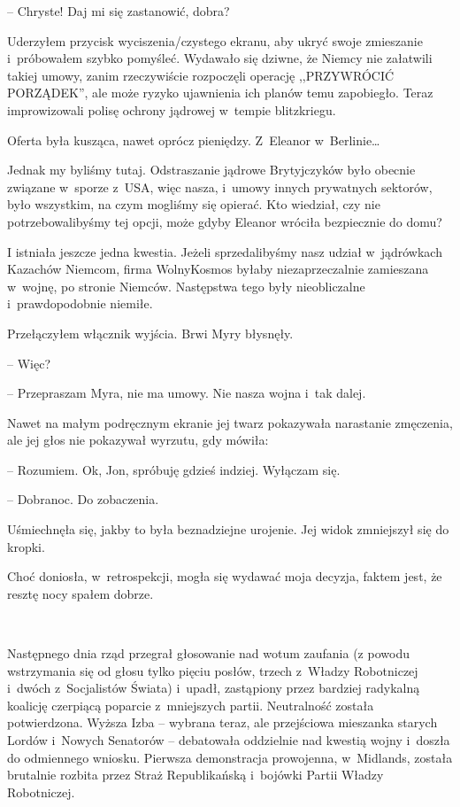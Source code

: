 \documentclass[oneside,polish,11pt,sfheadings]{mwbk}
\begin{document}
-- Chryste! Daj mi się zastanowić, dobra?

Uderzyłem przycisk wyciszenia/czystego ekranu, aby ukryć swoje
zmieszanie i~próbowałem szybko pomyśleć. Wydawało się dziwne, że Niemcy
nie załatwili takiej umowy, zanim rzeczywiście rozpoczęli operację
,,PRZYWRÓCIĆ PORZĄDEK'', ale może ryzyko ujawnienia ich planów temu
zapobiegło. Teraz improwizowali polisę ochrony jądrowej w~tempie
blitzkriegu.

Oferta była kusząca, nawet oprócz pieniędzy. Z~Eleanor w~Berlinie\ldots

Jednak my byliśmy tutaj. Odstraszanie jądrowe Brytyjczyków było obecnie
związane w~sporze z~USA, więc nasza, i~umowy innych prywatnych sektorów,
było wszystkim, na czym mogliśmy się opierać. Kto wiedział, czy nie
potrzebowalibyśmy tej opcji, może gdyby Eleanor wróciła bezpiecznie do
domu?

I istniała jeszcze jedna kwestia. Jeżeli sprzedalibyśmy nasz udział w~jądrówkach Kazachów Niemcom, firma WolnyKosmos byłaby niezaprzeczalnie
zamieszana w~wojnę, po stronie Niemców. Następstwa tego były
nieobliczalne i~prawdopodobnie niemiłe.

Przełączyłem włącznik wyjścia. Brwi Myry błysnęły.

-- Więc?

-- Przepraszam Myra, nie ma umowy. Nie nasza wojna i~tak dalej.

Nawet na małym podręcznym ekranie jej twarz pokazywała narastanie
zmęczenia, ale jej głos nie pokazywał wyrzutu, gdy mówiła: 

-- Rozumiem. Ok, Jon, spróbuję gdzieś indziej. Wyłączam się.

-- Dobranoc. Do zobaczenia.

Uśmiechnęła się, jakby to była beznadziejne urojenie. Jej widok
zmniejszył się do kropki.

Choć doniosła, w~retrospekcji, mogła się wydawać moja decyzja, faktem
jest, że resztę nocy spałem dobrze.

~

Następnego dnia rząd przegrał głosowanie nad wotum zaufania (z powodu
wstrzymania się od głosu tylko pięciu posłów, trzech z~Władzy
Robotniczej i~dwóch z~Socjalistów Świata) i~upadł, zastąpiony przez
bardziej radykalną koalicję czerpiącą poparcie z~mniejszych partii.
Neutralność została potwierdzona. Wyższa Izba -- wybrana teraz, ale
przejściowa mieszanka starych Lordów i~Nowych Senatorów -- debatowała
oddzielnie nad kwestią wojny i~doszła do odmiennego wniosku. Pierwsza
demonstracja prowojenna, w~Midlands, została brutalnie rozbita przez
Straż Republikańską i~bojówki Partii Władzy Robotniczej.
\end{document}
